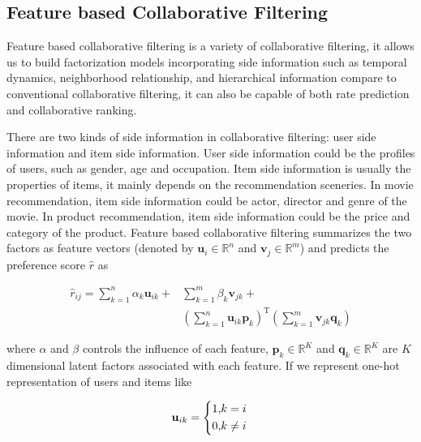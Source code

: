 \documentclass{sig-alternate-05-2015}
\begin{document}
\subsection{Feature based Collaborative Filtering}
Feature based collaborative filtering \cite{chen2012svdfeature} is a variety of
collaborative filtering, it allows us to build factorization models incorporating
side information such as temporal dynamics, neighborhood relationship,
and hierarchical information compare to conventional collaborative filtering,
it can also be capable of both rate prediction and collaborative ranking.

There are two kinds of side information in collaborative filtering:
user side information and item side information.
User side information could be the profiles of users, such as
gender, age and occupation.
Item side information is usually the properties of items,
it mainly depends on the recommendation sceneries.
In movie recommendation, item side information could be actor, director and genre
of the movie. In product recommendation, item side information could be the price
and category of the product.
Feature based collaborative filtering summarizes the two factors as feature vectors
(denoted by $\mathbf{u}_i \in \mathbb{R}^{n}$ and $\mathbf{v}_j \in \mathbb{R}^{m}$) and predicts
the preference score $\hat{r}$ as

\begin{equation}
\begin{aligned}
\hat{r}_{ij} = \sum_{k=1}^{n} \alpha_k \mathbf{u}_{ik} + &\sum_{k=1}^{m} \beta_k \mathbf{v}_{jk} + \\
&\left( \sum_{k=1}^{n} \mathbf{u}_{ik} \mathbf{p}_k \right) ^ \mathrm{T}
\left( \sum_{k=1}^{m} \mathbf{v}_{jk} \mathbf{q}_k \right)
\end{aligned}
\end{equation}

where $\alpha$ and $\beta$ controls the influence of each feature,
$\mathbf{p}_{k} \in \mathbb{R}^K$ and $\mathbf{q}_{k} \in \mathbb{R}^K$
are $K$ dimensional latent factors associated with each feature.
If we represent one-hot representation of users and items like

\begin{equation}
    \mathbf{u}_{ik} =
    \left\{
        \begin{aligned}
            1, &k = i \\
            0, &k \not= i
        \end{aligned}
    \right. \\
\end{equation}
\end{document}
